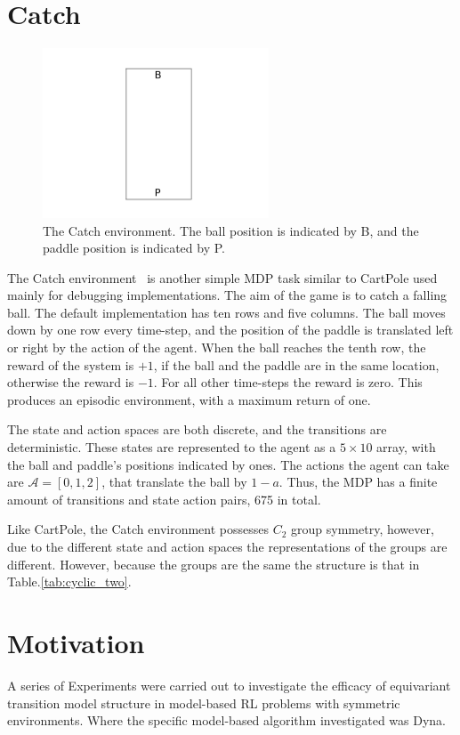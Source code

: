 \section{Catch}\label{sec:catch}
\begin{figure}[h!]
	\centering
	\includegraphics[width = 0.6\textwidth]{Figures/catch_env.png}
	\caption{The Catch environment. The ball position is indicated by B, and the paddle position is indicated by P.}
	\label{fig:catch_env}
\end{figure}
The Catch environment~\cite{osband2020bsuite} is another simple MDP task similar to CartPole used mainly for debugging implementations. The aim of the game is to catch a falling ball. The default implementation has ten rows and five columns. The ball moves down by one row every time-step, and the position of the paddle is translated left or right by the action of the agent. When the ball reaches the tenth row, the reward of the system is $+1$, if the ball and the paddle are in the same location, otherwise the reward is $-1$. For all other time-steps the reward is zero. This produces an episodic environment, with a maximum return of one.

The state and action spaces are both discrete, and the transitions are deterministic. These states are represented to the agent as a $5\times 10$ array, with the ball and paddle's positions indicated by ones. The actions the agent can take are $\mathcal{A} = [0, 1, 2]$, that translate the ball by $1-a$. Thus, the MDP has a finite amount of transitions and state action pairs, 675 in total.

Like CartPole, the Catch environment possesses $C_2$ group symmetry, however, due to the different state and action spaces the representations of the groups are different. However, because the groups are the same the structure is that in Table.\ref{tab:cyclic_two}.

\section{Motivation}
A series of Experiments were carried out to investigate the efficacy of equivariant transition model structure in model-based RL problems with symmetric environments. Where the specific model-based algorithm investigated was Dyna.

